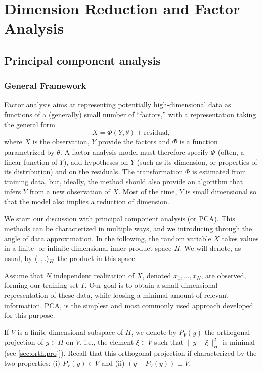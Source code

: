 
\chapter{Dimension Reduction and Factor Analysis}
\label{chap:unsupervised}
\label{chap:dim.red}


\section{Principal component analysis}
\label{sec:pca}

\subsection{General Framework}

Factor analysis aims at representing potentially high-dimensional data as functions of a (generally) small number of ``factors,'' with a representation taking the general form
\begin{equation}
\label{eq:fact.anal.gen}
X = \Phi(Y, \theta) + \text{residual},
\end{equation}
where $X$ is the observation, $Y$ provide the factors and $\Phi$ is a function parametrized by $\theta$.
A factor analysis model must therefore specify $\Phi$ (often, a linear function of $Y$), add hypotheses on $Y$ (such as its dimension, or properties of its distribution) and on the residuals.
The transformation $\Phi$ is estimated from training data, but, ideally, the method should also provide an algorithm that infers $Y$ from a new observation of $X$. Most of the time,  $Y$ is small dimensional so that the model also implies a reduction of dimension.

We start our discussion with principal component analysis (or PCA). This methods can be characterized in multiple ways, and we introducing through the angle of data approximation. In the following, the random variable $X$ takes values in a finite- or
infinite-dimensional inner-product space $H$. We will denote, as usual, by
${\langle {.}\mathbin{,} {.}\rangle}_H$ the product in this space. 

Assume that $N$ independent realization of $X$, denoted $x_1, \ldots, x_N$, are observed, forming our training set $T$. Our goal is to obtain a small-dimensional representation of these data, while loosing a minimal amount of relevant information. PCA, is the simplest and most commonly used approach developed for this purpose.

If $V$ is a finite-dimensional subspace of $H$, we denote by $P_V(y)$  the orthogonal projection of $y\in H$ on $V$, i.e., the element $\xi\in V$ such that $\|y-\xi\|^2_H$ is minimal (see \cref{sec:orth.proj}).  Recall that this orthogonal projection if characterized by the two properties: (i) $P_V(y) \in V$ and (ii) $(y-P_V(y)) \perp V$.

